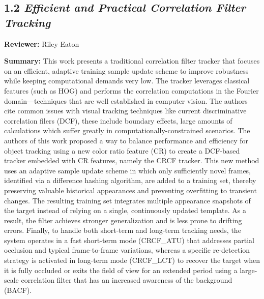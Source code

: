 \documentclass{article}
\begin{document}
\vspace{0.3cm}

\subsection*{1.2 \textit{Efficient and Practical Correlation Filter Tracking}}

\hspace*{\parindent}\textbf{Reviewer:} Riley Eaton

\vspace{0.3cm}

\textbf{Summary:} This work presents a traditional correlation filter tracker that focuses on an efficient, adaptive training sample update scheme to improve robustness while keeping computational demands very low. The tracker leverages classical features (such as HOG) and performs the correlation computations in the Fourier domain—techniques that are well established in computer vision. The authors cite common issues with visual tracking techniques like current discriminative correlation filers (DCF), these include boundary effects, large amounts of calculations which suffer greatly\textsl{} in computationally-constrained scenarios. The authors of this work proposed a way to balance performance and efficiency for object tracking using a new color ratio feature (CR) to create a DCF-based tracker embedded with CR features, namely the CRCF tracker. This new method uses an adaptive sample update scheme in which only sufficiently novel frames, identified via a difference hashing algorithm, are added to a training set, thereby preserving valuable historical appearances and preventing overfitting to transient changes. The resulting training set integrates multiple appearance snapshots of the target instead of relying on a single, continuously updated template. As a result, the filter achieves stronger generalization and is less prone to drifting errors. Finally, to handle both short-term and long-term tracking needs, the system operates in a fast short-term mode (CRCF\_ATU) that addresses partial occlusion and typical frame-to-frame variations, whereas a specific re-detection strategy is activated in long-term mode (CRCF\_LCT) to recover the target when it is fully occluded or exits the field of view for an extended period using a large-scale correlation filter that has an increased awareness of the background (BACF).

\vspace{0.3cm}
\end{document}

